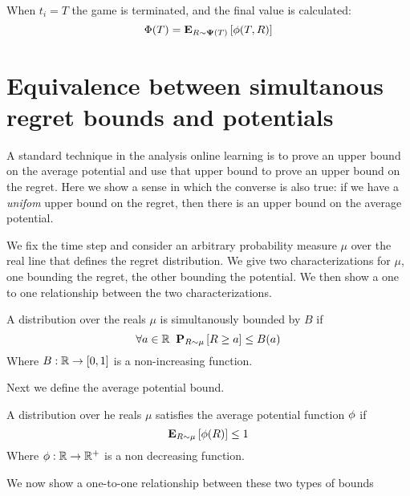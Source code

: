 \documentclass[12pt]{article} %
\begin{document}
When $t_i=T$ the game is terminated, and the final value is calculated:
$$\Phi(T) ={\bf E}_{R \sim {\bf \Psi}(T)}\left[ \phi(T,R) \right]$$


\section{Equivalence between simultanous regret bounds and potentials}

A standard technique in the analysis online learning is to prove an
upper bound on the average potential and use that upper bound to prove
an upper bound on the regret. Here we show a sense in which the
converse is also true: if we have a {\em unifom} upper bound on the
regret, then there is an upper bound on the average
potential. 

We fix the time step and consider an arbitrary probability measure $\mu$ over
the real line that defines the regret distribution. We give two
characterizations for $\mu$, one bounding the regret, the other
bounding the potential. We then show a one to one relationship between
the two characterizations.

\begin{definition} \label{def:unif-regret-bound}
  A distribution over the reals $\mu$ is simultanously bounded by $B$ if
  \[
    \forall a \in \mathbb{R} \;\; {\bf P}_{R \sim \mu}\left[ R \geq a \right] \leq B(a)
  \]
Where $B: \mathbb{R} \to [0,1]$ is a non-increasing function.
\end{definition}

Next we define the average potential bound.
\begin{definition} \label{def:aver-potential-bound}
  A distribution over he reals $\mu$ satisfies the average
  potential function $\phi$ if
  $${\bf E}_{R \sim \mu}\left[ \phi(R) \right] \leq 1$$
  Where $\phi: \mathbb{R} \to \mathbb{R}^+$ is a non decreasing function. 
\end{definition}

We now show a one-to-one relationship between these two types of bounds
\end{document}
